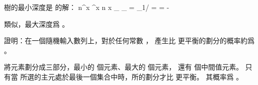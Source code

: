 \startANSWER
樹的最小深度是  的解：
\startformula\startmathalignment[n=1]
\NC n\alpha^x  \NR
\NC \Downarrow \NR
\NC \alpha^x \le {} n \NR
\NC \Downarrow \NR
\NC x \ge \log_{\alpha} \NR
\NC \Downarrow \NR
\NC \log_{\alpha} = \log_{1/\alpha}
                             = 
                             = -  \NR
\stopmathalignment\stopformula

類似，最大深度爲 。
\stopANSWER

\DIFFICULT
證明：在一個隨機輸入數列上，對於任何常數 ，
  產生比  更平衡的劃分的概率約爲 。
\stopEXERCISE

\startANSWER
將元素劃分成三部分，最小的  個元素、最大的  個元素，
還有  個中間值元素。
只有當  所選的主元處於最後一個集合中時，所的劃分才比  更平衡。
其概率爲 。
\stopANSWER
